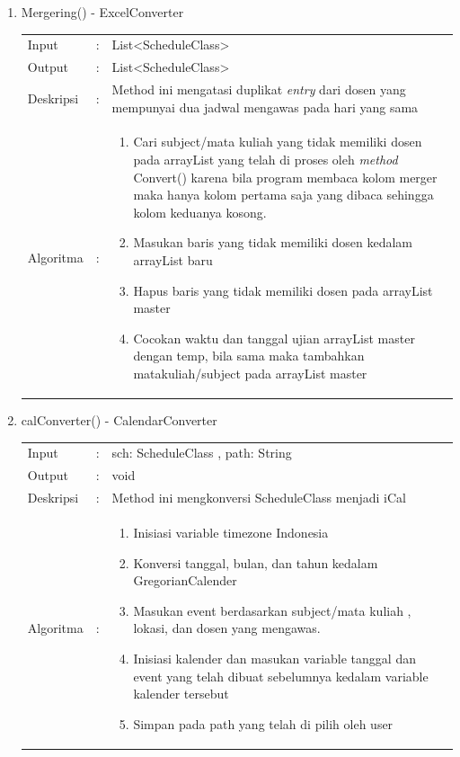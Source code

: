 \begin{enumerate}
	\item Mergering() - ExcelConverter\\
	\begin{tabular}{l c p{9cm}}
		Input & : & List<ScheduleClass> \\ 
		Output & : & List<ScheduleClass> \\ 
		Deskripsi & : & Method ini mengatasi duplikat \textit{entry} dari dosen yang mempunyai dua jadwal mengawas pada hari yang sama\\
		Algoritma & : & 
			\begin{enumerate}
				\item Cari subject/mata kuliah yang tidak memiliki dosen pada arrayList yang telah di proses oleh \textit{method} Convert() karena bila program membaca kolom merger maka hanya kolom pertama saja yang dibaca sehingga kolom keduanya kosong.
				\item Masukan baris yang tidak memiliki dosen kedalam arrayList baru
				\item Hapus baris yang tidak memiliki dosen pada arrayList master
				\item Cocokan waktu dan tanggal ujian arrayList master dengan temp, bila sama maka tambahkan matakuliah/subject pada arrayList master
			\end{enumerate}
		\end{tabular}	
	
	\item calConverter() - CalendarConverter\\
	\begin{tabular}{l c p{9cm}}
		Input & : & sch: ScheduleClass , path: String\\ 
		Output & : & void \\ 
		Deskripsi & : & Method ini mengkonversi ScheduleClass menjadi iCal\\
		Algoritma & : & 
			\begin{enumerate}
				\item Inisiasi variable timezone Indonesia
				\item Konversi tanggal, bulan, dan tahun kedalam GregorianCalender
				\item Masukan event berdasarkan subject/mata kuliah , lokasi, dan dosen yang mengawas.
				\item Inisiasi kalender dan masukan variable tanggal dan event yang telah dibuat sebelumnya kedalam variable kalender tersebut
				\item Simpan pada path yang telah di pilih oleh user
			\end{enumerate}
		\end{tabular}	
		

\end{enumerate}
